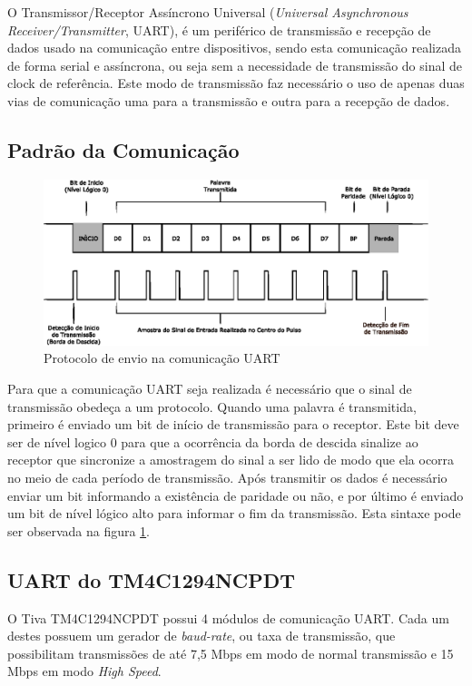 O Transmissor/Receptor Assíncrono Universal (\emph{Universal Asynchronous Receiver/Transmitter}, UART), é um periférico de transmissão e recepção de dados usado na comunicação entre dispositivos, sendo esta comunicação realizada de forma serial e assíncrona, ou seja sem a necessidade de transmissão do sinal de clock de referência. Este modo de transmissão faz necessário o uso de apenas duas vias de comunicação uma para a transmissão e outra para a recepção de dados.

\subsection{Padrão da Comunicação}

\begin{figure}[H]
\centering
\includegraphics[width=1\textwidth] {figuras/uart.eps}
    \caption{Protocolo de envio na comunicação UART}
    \label{fig:uart}
\end{figure}

Para que a comunicação UART seja realizada é necessário que o sinal de transmissão obedeça a um protocolo. Quando uma palavra é transmitida, primeiro é enviado um bit de início de transmissão para o receptor. Este bit deve ser de nível logico 0 para que a ocorrência da borda de descida sinalize ao receptor que sincronize a amostragem do sinal a ser lido de modo que ela ocorra no meio de cada período de transmissão.  Após transmitir os dados é necessário enviar um bit informando a existência de paridade ou não, e por último é enviado um bit de nível lógico alto para informar o fim da transmissão. Esta sintaxe pode ser observada na figura \ref{fig:uart}.

\subsection{UART do TM4C1294NCPDT}


O Tiva TM4C1294NCPDT possui 4 módulos de comunicação UART. Cada um destes  possuem um gerador de \emph{baud-rate}, ou taxa de transmissão, que possibilitam  transmissões de até 7,5 Mbps em modo de normal transmissão e  15 Mbps em modo \emph{High Speed}. 

